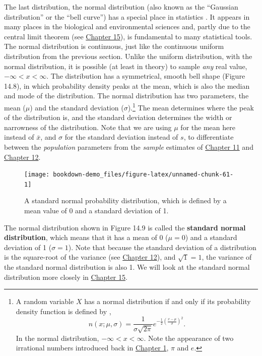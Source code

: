 \documentclass[
]{scrbook}
\begin{document}
The last distribution, the normal distribution (also known as the ``Gaussian distribution'' or the ``bell curve'') has a special place in statistics \citep{Miller2004, Navarro2022}.
It appears in many places in the biological and environmental sciences and, partly due to the central limit theorem (see \protect\hyperlink{Chapter_15}{Chapter 15}), is fundamental to many statistical tools.
The normal distribution is continuous, just like the continuous uniform distribution from the previous section.
Unlike the uniform distribution, with the normal distribution, it is possible (at least in theory) to sample \emph{any} real value, \(-\infty < x < \infty\).
The distribution has a symmetrical, smooth bell shape (Figure 14.8), in which probability density peaks at the mean, which is also the median and mode of the distribution.
The normal distribution has two parameters, the mean (\(\mu\)) and the standard deviation (\(\sigma\)).\footnote{A random variable \(X\) has a normal distribution if and only if its probability density function is defined by \citep{Miller2004}, \[n\left(x; \mu, \sigma\right) = \frac{1}{\sigma\sqrt{2\pi}}e^{-\frac{1}{2}\left(\frac{x - \mu}{\sigma}\right)^{2}}.\] In the normal distribution, \(-\infty < x < \infty\). Note the appearance of two irrational numbers introduced back in \protect\hyperlink{Chapter_1}{Chapter 1}, \(\pi\) and \(e\).}
The mean determines where the peak of the distribution is, and the standard deviation determines the width or narrowness of the distribution.
Note that we are using \(\mu\) for the mean here instead of \(\bar{x}\), and \(\sigma\) for the standard deviation instead of \(s\), to differentiate between the \emph{population} parameters from the \emph{sample} estimates of \protect\hyperlink{Chapter_11}{Chapter 11} and \protect\hyperlink{Chapter_12}{Chapter 12}.

\begin{figure}
\texttt{[image: bookdown-demo\_files/figure-latex/unnamed-chunk-61-1]} \caption{A standard normal probability distribution, which is defined by a mean value of 0 and a standard deviation of 1.}\label{fig:unnamed-chunk-61}
\end{figure}

The normal distribution shown in Figure 14.9 is called the \textbf{standard normal distribution}, which means that it has a mean of 0 (\(\mu = 0\)) and a standard deviation of 1 (\(\sigma = 1\)).
Note that because the standard deviation of a distribution is the square-root of the variance (see \protect\hyperlink{Chapter_12}{Chapter 12}), and \(\sqrt{1} = 1\), the variance of the standard normal distribution is also 1.
We will look at the standard normal distribution more closely in \protect\hyperlink{Chapter_15}{Chapter 15}.
\end{document}
